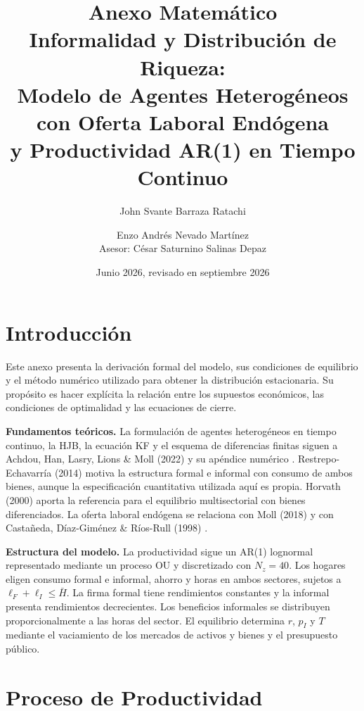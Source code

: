 \documentclass[12pt]{article}
\title{\textbf{Anexo Matemático}\\[0.3em]
\large Informalidad y Distribución de Riqueza:\\
Modelo de Agentes Heterogéneos con Oferta Laboral Endógena\\
y Productividad AR(1) en Tiempo Continuo}
\author{John Svante Barraza Ratachi \and Enzo Andrés Nevado Martínez\\
Asesor: César Saturnino Salinas Depaz}
\date{Junio 2026, revisado en septiembre 2026}
\begin{document}
\maketitle
\tableofcontents
\newpage

\section{Introducción}

Este anexo presenta la derivación formal del modelo, sus condiciones de equilibrio y el método numérico utilizado para obtener la distribución estacionaria. Su propósito es hacer explícita la relación entre los supuestos económicos, las condiciones de optimalidad y las ecuaciones de cierre.

\textbf{Fundamentos teóricos.} La formulación de agentes heterogéneos en tiempo continuo, la HJB, la ecuación KF y el esquema de diferencias finitas siguen a Achdou, Han, Lasry, Lions \& Moll (2022) \cite{achdou2022} y su apéndice numérico \cite{hact_appendix}. Restrepo-Echavarría (2014) \cite{restrepo2014} motiva la estructura formal e informal con consumo de ambos bienes, aunque la especificación cuantitativa utilizada aquí es propia. Horvath (2000) \cite{horvath2000} aporta la referencia para el equilibrio multisectorial con bienes diferenciados. La oferta laboral endógena se relaciona con Moll (2018) \cite{moll_labor} y con Castañeda, Díaz-Giménez \& Ríos-Rull (1998) \cite{castaneda1998}.

\textbf{Estructura del modelo.} La productividad sigue un AR(1) lognormal representado mediante un proceso OU y discretizado con $N_z=40$. Los hogares eligen consumo formal e informal, ahorro y horas en ambos sectores, sujetos a $\ell_F+\ell_I\leq\bar H$. La firma formal tiene rendimientos constantes y la informal presenta rendimientos decrecientes. Los beneficios informales se distribuyen proporcionalmente a las horas del sector. El equilibrio determina $r$, $p_I$ y $T$ mediante el vaciamiento de los mercados de activos y bienes y el presupuesto público.

\section{Proceso de Productividad}
\end{document}
